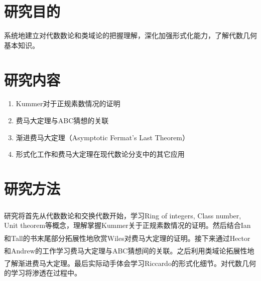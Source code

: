 \documentclass{article}
\newcommand{\upcite}[1]{\textsuperscript{\textsuperscript{\cite{#1}}}}
\begin{document}
\setcounter{section}{0}
\section{研究目的}

\noindent
系统地建立对代数数论和类域论的把握理解，深化加强形式化能力，了解代数几何基本知识。

\section{研究内容}

\begin{enumerate}
\item Kummer对于正规素数情况的证明
\item 费马大定理与ABC猜想的关联
\item 渐进费马大定理（Asymptotic Fermat's Last Theorem）
\item 形式化工作和费马大定理在现代数论分支中的其它应用
\end{enumerate}

\section{研究方法}

\noindent
研究将首先从代数数论\upcite{ref1}\upcite{ref2}\upcite{ref3}\upcite{ref6}和交换代数\upcite{ref5}开始，学习Ring of integers, Class number, Unit theorem等概念，理解掌握Kummer关于正规素数情况的证明。然后结合Ian和Tall的书\upcite{ref2}末尾部分拓展性地欣赏Wiles对费马大定理的证明。接下来通过Hector\upcite{ref8}和Andrew\upcite{ref11}的工作学习费马大定理与ABC猜想间的关联。之后利用类域论\upcite{ref4}\upcite{ref6}拓展性地了解渐进费马大定理\upcite{ref10}。最后实际动手体会学习Riccardo\upcite{ref12}的形式化细节。对代数几何\upcite{ref7}的学习将渗透在过程中。
\end{document}
